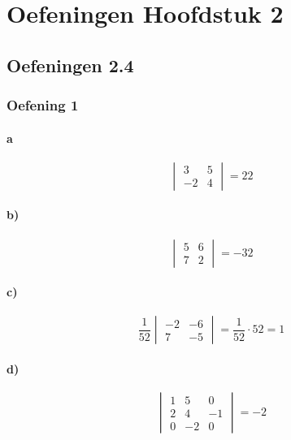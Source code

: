 \documentclass[lineaire_algebra_oplossingen.tex]{subfiles}
\begin{document}
\chapter{Oefeningen Hoofdstuk 2}
\section{Oefeningen 2.4}
\subsection{Oefening 1}
\subsubsection*{a}
\[
\begin{vmatrix}
3 & 5\\
-2 & 4
\end{vmatrix}
= 22
\]
\subsubsection*{b)}
\[
\begin{vmatrix}
5 & 6\\
7 & 2
\end{vmatrix}
= -32
\]
\subsubsection*{c)}
\[
\frac{1}{52} 
\begin{vmatrix}
-2 & -6\\
7 & -5
\end{vmatrix} 
= \frac{1}{52} \cdot 52 = 1
\]
\subsubsection*{d)}
\[
\begin{vmatrix}
1 & 5 & 0\\
2 & 4 & -1\\
0 & -2 & 0
\end{vmatrix}
= -2
\]
\end{document}
